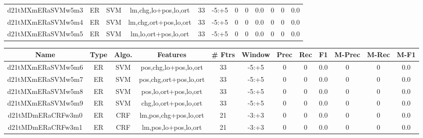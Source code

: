 \documentclass[a4paper]{article}
\begin{document}
\begin{landscape}
\begin{center}
\begin{tabular}{ |c|c|c|c|c|c|c|c|c|c|c|c|}
 
 	
 	\small{ d21tMXmERaSVMw5m3 } & ER & SVM & lm,chg,lo+pos,lo,ort  &  33 &  -5:+5  &  0 & 0 & 0.0  &  0 & 0 & 0.0 \\
 	

 
 	
 	\small{ d21tMXmERaSVMw5m4 } & ER & SVM & lm,chg,ort+pos,lo,ort  &  33 &  -5:+5  &  0 & 0 & 0.0  &  0 & 0 & 0.0 \\
 	

 
 	
 	\small{ d21tMXmERaSVMw5m5 } & ER & SVM & lm,lo,ort+pos,lo,ort  &  33 &  -5:+5  &  0 & 0 & 0.0  &  0 & 0 & 0.0 \\
 	
 \hline
\end{tabular}
\end{center}




\begin{center}
\begin{tabular}{ |c|c|c|c|c|c|c|c|c|c|c|c|} 
 \hline
 	Name & Type & Algo. & Features & \# Ftrs & Window & Prec & Rec & F1 & M-Prec & M-Rec & M-F1\\
 \hline

 	

 
 	
 	\small{ d21tMXmERaSVMw5m6 } & ER & SVM & pos,chg,lo+pos,lo,ort  &  33 &  -5:+5  &  0 & 0 & 0.0  &  0 & 0 & 0.0 \\
 	

 
 	
 	\small{ d21tMXmERaSVMw5m7 } & ER & SVM & pos,chg,ort+pos,lo,ort  &  33 &  -5:+5  &  0 & 0 & 0.0  &  0 & 0 & 0.0 \\
 	

 
 	
 	\small{ d21tMXmERaSVMw5m8 } & ER & SVM & pos,lo,ort+pos,lo,ort  &  33 &  -5:+5  &  0 & 0 & 0.0  &  0 & 0 & 0.0 \\
 	

 
 	
 	\small{ d21tMXmERaSVMw5m9 } & ER & SVM & chg,lo,ort+pos,lo,ort  &  33 &  -5:+5  &  0 & 0 & 0.0  &  0 & 0 & 0.0 \\
 	

 
 	
 	\small{ d21tMDmERaCRFw3m0 } & ER & CRF & lm,pos,chg+pos,lo,ort  &  21 &  -3:+3  &  0 & 0 & 0.0  &  0 & 0 & 0.0 \\
 	

 
 	
 	\small{ d21tMDmERaCRFw3m1 } & ER & CRF & lm,pos,lo+pos,lo,ort  &  21 &  -3:+3  &  0 & 0 & 0.0  &  0 & 0 & 0.0 \\
 	


\end{tabular}
\end{center}
\end{landscape}
\end{document}
